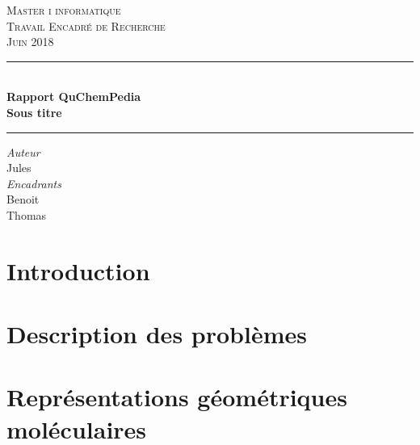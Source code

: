 \documentclass{report}
\begin{document}
\begin{titlepage}
	\centering
	
    \vspace*{1.2 cm}
    
   	\textsc{\LARGE Master i informatique\\Travail Encadré de Recherche\\[0.3cm]\large Juin 2018}

	\vspace{2.2cm}
    
    
	\rule{\linewidth }{0.2 mm} \\[0.15 cm]
    {\LARGE \textbf{Rapport QuChemPedia}\\[0.2cm] \large
		\textbf{Sous titre}}\\
	\rule{\linewidth}{0.2 mm}
       \vspace*{0.1 cm}
	
	\begin{center}
	\vspace{0.3cm}
	
	\emph{Auteur}\\
	\vspace{0.1cm}
	Jules \\ 
	
	
	\vspace{0.5cm}
	\emph{Encadrants}\\
	\vspace{0.1cm}
	Benoit \\
	Thomas 
	\end{center}		
	
	\vspace{1.0cm}


    
    
\end{titlepage}


\tableofcontents

\chapter{Introduction}
	

\chapter{Description des problèmes}
		
\chapter{Représentations géométriques moléculaires}
\end{document}

